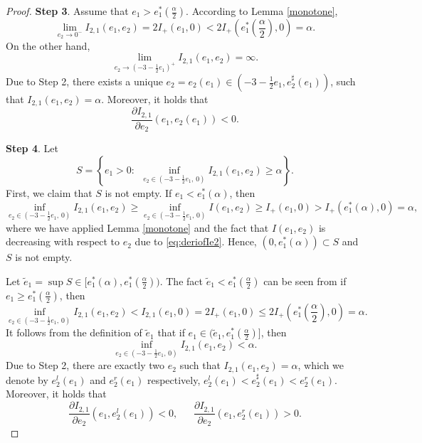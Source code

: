 \documentclass[reqno,12pt]{amsart}
\begin{document}
{\begin{proof}
\textbf{Step 3}. Assume that $e_1> e_1^*(\frac{\alpha}{2})$. According to Lemma \ref{monotone}, 
\begin{equation*}
    \lim_{e_2 \to 0^-} I_{2, 1}(e_1, e_2) =  2I_{+} (e_1, 0) < 2 I_{+} \left(e_1^* (\frac{\alpha}{2}), 0\right) = \alpha. 
\end{equation*}
On the other hand, 
\begin{equation*}
    \lim_{e_2 \to (-3-\frac12 e_1)^+ } I_{2, 1}(e_1, e_2) = \infty. 
\end{equation*}
Due to Step 2, there exists a unique $e_2 = e_2(e_1)\in (-3 -\frac12 e_1, {e}^\sharp_2(e_1))$, such that $I_{2, 1}(e_1, e_2) = \alpha$. Moreover, it holds that 
\begin{equation*}
    \frac{\partial I_{2, 1} }{\partial e_2}(e_1, e_2(e_1)) <0. 
\end{equation*}
 
    \textbf{Step 4}. 
Let 
\begin{equation*}
    S = \left\{ e_1>0: \ \ \inf_{e_2\in(-3-\frac{1}{2}e_1,\, 0)}I_{2,1}(e_1,e_2) \geq \alpha  \right\}. 
\end{equation*}
    First, we claim that $S$ is not empty. If $e_1 <  e_1^*(\alpha)$, then
    \begin{equation*}
      \inf_{e_2\in(-3-\frac{1}{2}e_1,\, 0)}  I_{2, 1}(e_1, e_2) \geq \inf_{e_2\in(-3-\frac{1}{2}e_1,\, 0)}  I(e_1, e_2) \geq I_{+}(e_1, 0) > I_{+}(e_1^*(\alpha), 0) =\alpha, 
    \end{equation*}
    where we have applied Lemma \ref{monotone} and the fact that $ I(e_1, e_2)$ is decreasing with respect to $e_2$ due to \eqref{eq:deriofIe2}. Hence, $(0, e_1^*(\alpha))\subset S$ and $S$ is not empty. 

     Let $\tilde{e}_1= \sup S\in [ e_1^*(\alpha),  e_1^*(\frac{\alpha}{2})) $. 
     The fact $\tilde{e}_1<e_1^*(\frac{\alpha}{2})$ can be seen from
      if $e_1 \geq  e_1^*(\frac{\alpha}{2})$, then
    \begin{equation*}
      \inf_{e_2\in(-3-\frac{1}{2}e_1,\, 0)}  I_{2, 1}(e_1, e_2) <  I_{2, 1}(e_1, 0)  =2I_{+}(e_1, 0) \leq 2 I_{+}(e_1^*\left(\frac{\alpha}{2}\right), 0) =\alpha. 
    \end{equation*}
     It follows from the definition of $\tilde{e}_1$ that if $e_1\in (\tilde{e}_1, e_1^*(\frac{\alpha}{2})]$, then
       $$\inf_{e_2\in(-3-\frac{1}{2}e_1,\, 0)}I_{2,1}(e_1,e_2) < \alpha .$$ Due to Step 2, there are exactly two $e_2$ such that $I_{2,1}(e_1,e_2)=\alpha$, which we denote by $e_2^l(e_1)$ and $e_2^r (e_1) $ respectively, $e_2^l(e_1) < {e}^\sharp_2(e_1) < e_2^r(e_1)$. Moreover, it holds that 
       \begin{equation*}
        \frac{\partial I_{2, 1} }{\partial e_2}(e_1, e_2^l(e_1)) <0, \ \ \ \ \ \ \ \frac{\partial I_{2, 1} }{\partial e_2}(e_1, e_2^r(e_1)) >0. 
       \end{equation*}


\end{proof}}
\end{document}
